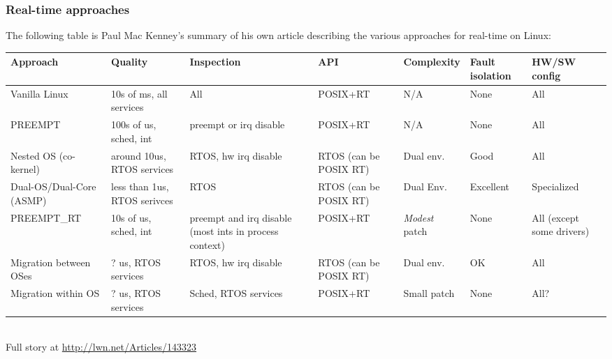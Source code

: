 \begin{frame}
  \frametitle{Real-time approaches} The following table is Paul Mac
  Kenney's summary of his own article describing the various
  approaches for real-time on Linux:\\
  \vspace{0.3cm}
  \tiny
  \begin{tabular}{|p{1.2cm}|p{1.2cm}|p{1.2cm}|p{1.2cm}|p{1.2cm}|p{1.2cm}|p{1.2cm}|}
    \hline
    {\bf Approach} & {\bf Quality} & {\bf Inspection} & {\bf API} & {\bf Complexity} & {\bf Fault isolation} & {\bf HW/SW config} \\
    \hline
    Vanilla Linux & 10s of ms, all services & All & POSIX+RT & N/A & None & All \\
    \hline
    PREEMPT & 100s of us, sched, int & preempt or irq disable & POSIX+RT & N/A & None & All \\
    \hline
    Nested OS (co-kernel) & around 10us, RTOS services & RTOS, hw irq disable & RTOS (can be POSIX RT) & Dual env. & Good & All \\
    \hline
    Dual-OS/Dual-Core (ASMP) & less than 1us, RTOS serivces & RTOS & RTOS (can be POSIX RT) & Dual Env. & Excellent & Specialized \\
    \hline
    PREEMPT\_RT & 10s of us, sched, int & preempt and irq disable (most ints in process context) & POSIX+RT & {\em Modest} patch & None & All (except some drivers) \\
    \hline
    Migration between OSes & ? us, RTOS services & RTOS, hw irq disable & RTOS (can be POSIX RT) & Dual env. & OK & All \\
    \hline
    Migration within OS & ? us, RTOS services & Sched, RTOS services & POSIX+RT & Small patch & None & All? \\
    \hline
  \end{tabular}\\
  \vspace{0.3cm}
  \normalsize
  Full story at \url{http://lwn.net/Articles/143323}
\end{frame}

